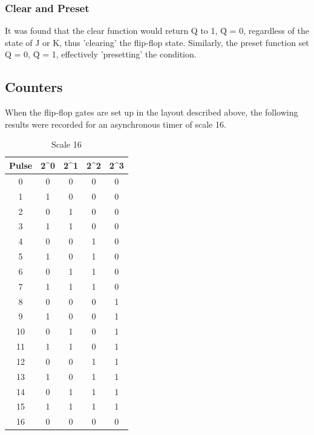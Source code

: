 \documentclass{article}
\begin{document}
\subsubsection*{Clear and Preset}
It was found that the clear function would return Q to 1, \=Q = 0, regardless of the state of J or K, thus 'clearing' the flip-flop state. Similarly, the preset function set Q = 0, \=Q = 1, effectively 'presetting' the condition.

\vspace{3cm}
\subsection*{Counters}
When the flip-flop gates are set up in the layout described above, the following results were recorded for an asynchronous timer of scale 16.
\begin{table}[h!]
    \centering
    \begin{tabular}{c|c c c c}
         Pulse & 2^0 & 2^1 & 2^2 & 2^3 \\
         \hline
         0& 0& 0& 0& 0\\
         1& 1& 0& 0& 0\\
         2& 0& 1& 0& 0\\
         3& 1& 1& 0& 0\\
         4& 0& 0& 1& 0\\
         5& 1& 0& 1& 0\\
         6& 0& 1& 1& 0\\
         7& 1& 1& 1& 0\\
         8& 0& 0& 0& 1\\
         9& 1& 0& 0& 1\\
         10& 0& 1& 0& 1\\
         11& 1& 1& 0& 1\\
         12& 0& 0& 1& 1\\
         13& 1& 0& 1& 1\\
         14& 0& 1& 1& 1\\
         15& 1& 1& 1& 1\\
         16& 0& 0& 0& 0\\
    \end{tabular}
    \caption{Scale 16}
    \label{tab:9}
\end{table}
\end{document}
